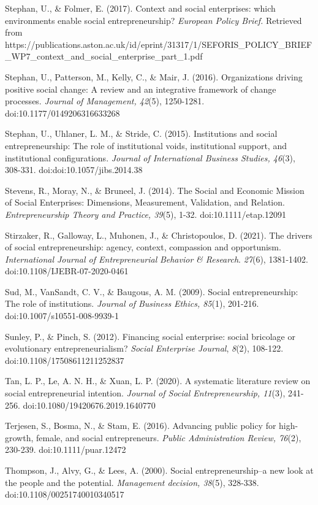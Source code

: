 \documentclass{article}
\begin{document}
Stephan, U., \& Folmer, E. (2017). Context and social enterprises: which environments enable social entrepreneurship? \emph{European Policy Brief. }Retrieved from https://publications.aston.ac.uk/id/eprint/31317/1/SEFORIS\_POLICY\_BRIEF\_WP7\_context\_and\_social\_enterprise\_part\_1.pdf

Stephan, U., Patterson, M., Kelly, C., \& Mair, J. (2016). Organizations driving positive social change: A review and an integrative framework of change processes. \emph{Journal of Management, 42}(5), 1250-1281. doi:10.1177/0149206316633268

Stephan, U., Uhlaner, L. M., \& Stride, C. (2015). Institutions and social entrepreneurship: The role of institutional voids, institutional support, and institutional configurations. \emph{Journal of International Business Studies, 46}(3), 308-331. doi:doi:10.1057/jibs.2014.38

Stevens, R., Moray, N., \& Bruneel, J. (2014). The Social and Economic Mission of Social Enterprises: Dimensions, Measurement, Validation, and Relation. \emph{Entrepreneurship Theory and Practice, 39}(5), 1-32. doi:10.1111/etap.12091

Stirzaker, R., Galloway, L., Muhonen, J., \& Christopoulos, D. (2021). The drivers of social entrepreneurship: agency, context, compassion and opportunism. \emph{International Journal of Entrepreneurial }\emph{Behavior}\emph{ \& Research}. \emph{27}(6), 1381-1402. doi:10.1108/IJEBR-07-2020-0461

Sud, M., VanSandt, C. V., \& Baugous, A. M. (2009). Social entrepreneurship: The role of institutions. \emph{Journal of Business Ethics, 85}(1), 201-216. doi:10.1007/s10551-008-9939-1

Sunley, P., \& Pinch, S. (2012). Financing social enterprise: social bricolage or evolutionary entrepreneurialism? \emph{Social Enterprise Journal}, \emph{8}(2), 108-122. doi:10.1108/17508611211252837

Tan, L. P., Le, A. N. H., \& Xuan, L. P. (2020). A systematic literature review on social entrepreneurial intention. \emph{Journal of Social Entrepreneurship, 11}(3), 241-256. doi:10.1080/19420676.2019.1640770

Terjesen, S., Bosma, N., \& Stam, E. (2016). Advancing public policy for high-growth, female, and social entrepreneurs. \emph{Public Administration Review, 76}(2), 230-239. doi:10.1111/puar.12472

Thompson, J., Alvy, G., \& Lees, A. (2000). Social entrepreneurship--a new look at the people and the potential. \emph{Management decision, 38}(5), 328-338. doi:10.1108/00251740010340517
\end{document}
